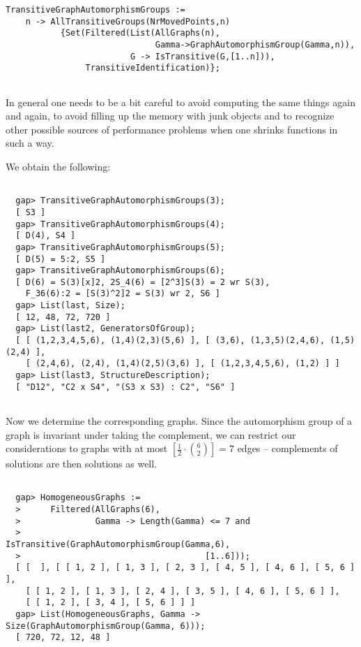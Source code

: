 \documentclass[a4paper,11pt]{report}
\begin{document}
{{\begin{description}
\begin{Verbatim}[fontsize=\small,frame=single,label=GAP code]
  TransitiveGraphAutomorphismGroups :=
    n -> AllTransitiveGroups(NrMovedPoints,n)
           {Set(Filtered(List(AllGraphs(n),
                              Gamma->GraphAutomorphismGroup(Gamma,n)),
                         G -> IsTransitive(G,[1..n])),
                TransitiveIdentification)};
  
\end{Verbatim}
 In general one needs to be a bit careful to avoid computing the same things
again and again, to avoid filling up the memory with junk objects and to
recognize other possible sources of performance problems when one shrinks
functions in such a way. 

 We obtain the following: \pagebreak[4]   
\begin{Verbatim}[fontsize=\small,frame=single,label=GAP session log]
  
  gap> TransitiveGraphAutomorphismGroups(3);
  [ S3 ]
  gap> TransitiveGraphAutomorphismGroups(4);
  [ D(4), S4 ]
  gap> TransitiveGraphAutomorphismGroups(5);
  [ D(5) = 5:2, S5 ]
  gap> TransitiveGraphAutomorphismGroups(6);
  [ D(6) = S(3)[x]2, 2S_4(6) = [2^3]S(3) = 2 wr S(3), 
    F_36(6):2 = [S(3)^2]2 = S(3) wr 2, S6 ]
  gap> List(last, Size);
  [ 12, 48, 72, 720 ]
  gap> List(last2, GeneratorsOfGroup);
  [ [ (1,2,3,4,5,6), (1,4)(2,3)(5,6) ], [ (3,6), (1,3,5)(2,4,6), (1,5)(2,4) ], 
    [ (2,4,6), (2,4), (1,4)(2,5)(3,6) ], [ (1,2,3,4,5,6), (1,2) ] ]
  gap> List(last3, StructureDescription);
  [ "D12", "C2 x S4", "(S3 x S3) : C2", "S6" ]
  
\end{Verbatim}
 Now we determine the corresponding graphs. Since the automorphism group of a
graph is invariant under taking the complement, we can restrict our
considerations to graphs with at most $[\frac{1}{2} \cdot \binom62] = 7$ edges -- complements of solutions are then solutions as well.    
\begin{Verbatim}[fontsize=\small,frame=single,label=GAP session log]
  
  gap> HomogeneousGraphs :=
  >      Filtered(AllGraphs(6),
  >               Gamma -> Length(Gamma) <= 7 and
  >                        IsTransitive(GraphAutomorphismGroup(Gamma,6),
  >                                     [1..6]));
  [ [  ], [ [ 1, 2 ], [ 1, 3 ], [ 2, 3 ], [ 4, 5 ], [ 4, 6 ], [ 5, 6 ] ], 
    [ [ 1, 2 ], [ 1, 3 ], [ 2, 4 ], [ 3, 5 ], [ 4, 6 ], [ 5, 6 ] ], 
    [ [ 1, 2 ], [ 3, 4 ], [ 5, 6 ] ] ]
  gap> List(HomogeneousGraphs, Gamma -> Size(GraphAutomorphismGroup(Gamma, 6)));
  [ 720, 72, 12, 48 ]
  

\end{Verbatim}
\end{description}}}
\end{document}
